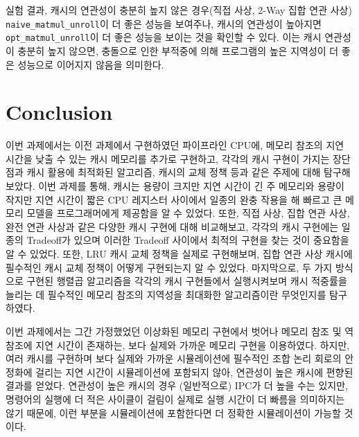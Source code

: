 \documentclass[openright, a4paper]{article}
\newcommand{\code}[1]{\texttt{#1}}
\begin{document}
\hfill

실험 결과, 캐시의 연관성이 충분히 높지 않은 경우(직접 사상, 2-Way 집합 연관 
사상) \code{naive_matmul_unroll}이 더 좋은 성능을 보여주나, 캐시의 연관성이
높아지면 \code{opt_matmul_unroll}이 더 좋은 성능을 보이는 것을 확인할 수 있다.
이는 캐시 연관성이 충분히 높지 않으면, 충돌으로 인한 부적중에 의해 프로그램의 
높은 지역성이 더 좋은 성능으로 이어지지 않음을 의미한다.

\hfill


\section{Conclusion}

\hfill

이번 과제에서는 이전 과제에서 구현하였던 파이프라인 CPU에, 메모리 참조의 지연
시간을 낮출 수 있는 캐시 메모리를 추가로 구현하고, 각각의 캐시 구현이 가지는 
장단점과 캐시 활용에 최적화된 알고리즘, 캐시의 교체 정책 등과 같은 주제에 대해
탐구해 보았다. 이번 과제를 통해, 캐시는 용량이 크지만 지연 시간이 긴 주 메모리와
용량이 작지만 지연 시간이 짧은 CPU 레지스터 사이에서 일종의 완충 작용을 해
빠르고 큰 메모리 모델을 프로그래머에게 제공함을 알 수 있었다. 또한, 직접 사상,
집합 연관 사상, 완전 연관 사상과 같은 다양한 캐시 구현에 대해 비교해보고, 각각의
캐시 구현에는 일종의 Tradeoff가 있으며 이러한 Tradeoff 사이에서 최적의 구현을
찾는 것이 중요함을 알 수 있었다. 또한, LRU 캐시 교체 정책을 실제로 구현해보며,
집합 연관 사상 캐시에 필수적인 캐시 교체 정책이 어떻게 구현되는지 알 수 있었다.
마지막으로, 두 가지 방식으로 구현된 행렬곱 알고리즘을 각각의 캐시 구현들에서
실행시켜보며 캐시 적중률을 늘리는 데 필수적인 메모리 참조의 지역성을 최대화한
알고리즘이란 무엇인지를 탐구하였다.

이번 과제에서는 그간 가정했었던 이상화된 메모리 구현에서 벗어나 메모리 참조
및 역참조에 지연 시간이 존재하는, 보다 실제와 가까운 메모리 구현을 이용하였다.
하지만, 여러 캐시를 구현하며 보다 실제와 가까운 시뮬레이션에 필수적인 조합 논리
회로의 안정화에 걸리는 지연 시간이 시뮬레이션에 포함되지 않아, 연관성이 높은
캐시에 편향된 결과를 얻었다. 연관성이 높은 캐시의 경우 (일반적으로) IPC가 더
높을 수는 있지만, 명령어의 실행에 더 적은 사이클이 걸림이 실제로 실행 시간이
더 빠름을 의미하지는 않기 때문에, 이런 부분을 시뮬레이션에 포함한다면 더 정확한
시뮬레이션이 가능할 것이다.

\hfill
\end{document}
